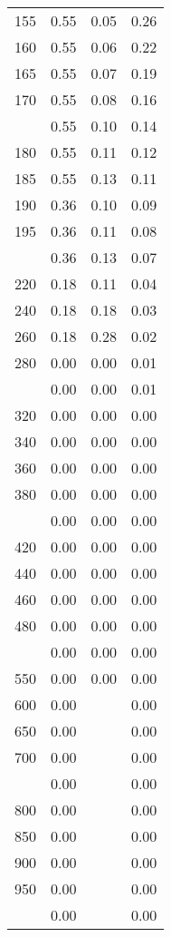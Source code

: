 \begin{table}[ht]
\begin{tabular}{lccc}
  155 & 0.55 & 0.05 & 0.26 \\ 
  160 & 0.55 & 0.06 & 0.22 \\ 
  165 & 0.55 & 0.07 & 0.19 \\ 
  170 & 0.55 & 0.08 & 0.16 \\ 
   \addlinespace
175 & 0.55 & 0.10 & 0.14 \\ 
  180 & 0.55 & 0.11 & 0.12 \\ 
  185 & 0.55 & 0.13 & 0.11 \\ 
  190 & 0.36 & 0.10 & 0.09 \\ 
  195 & 0.36 & 0.11 & 0.08 \\ 
   \addlinespace
200 & 0.36 & 0.13 & 0.07 \\ 
  220 & 0.18 & 0.11 & 0.04 \\ 
  240 & 0.18 & 0.18 & 0.03 \\ 
  260 & 0.18 & 0.28 & 0.02 \\ 
  280 & 0.00 & 0.00 & 0.01 \\ 
   \addlinespace
300 & 0.00 & 0.00 & 0.01 \\ 
  320 & 0.00 & 0.00 & 0.00 \\ 
  340 & 0.00 & 0.00 & 0.00 \\ 
  360 & 0.00 & 0.00 & 0.00 \\ 
  380 & 0.00 & 0.00 & 0.00 \\ 
   \addlinespace
400 & 0.00 & 0.00 & 0.00 \\ 
  420 & 0.00 & 0.00 & 0.00 \\ 
  440 & 0.00 & 0.00 & 0.00 \\ 
  460 & 0.00 & 0.00 & 0.00 \\ 
  480 & 0.00 & 0.00 & 0.00 \\ 
   \addlinespace
500 & 0.00 & 0.00 & 0.00 \\ 
  550 & 0.00 & 0.00 & 0.00 \\ 
  600 & 0.00 &  & 0.00 \\ 
  650 & 0.00 &  & 0.00 \\ 
  700 & 0.00 &  & 0.00 \\ 
   \addlinespace
750 & 0.00 &  & 0.00 \\ 
  800 & 0.00 &  & 0.00 \\ 
  850 & 0.00 &  & 0.00 \\ 
  900 & 0.00 &  & 0.00 \\ 
  950 & 0.00 &  & 0.00 \\ 
   \addlinespace
1000 & 0.00 &  & 0.00 \\ 
   \bottomrule
\end{tabular}
\end{table}
